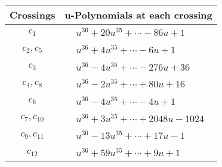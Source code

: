 \documentclass[1p]{elsarticle_modified}
\theoremstyle{definition}
\begin{document}
\begin{tabular}{m{50pt}|m{274pt}}
Crossings & \hspace{64pt}u-Polynomials at each crossing \\
\hline $$\begin{aligned}c_{1}\end{aligned}$$&$\begin{aligned}
&u^{36}+20 u^{35}+\cdots-86 u+1
\end{aligned}$\\
\hline $$\begin{aligned}c_{2},c_{5}\end{aligned}$$&$\begin{aligned}
&u^{36}+4 u^{35}+\cdots-6 u+1
\end{aligned}$\\
\hline $$\begin{aligned}c_{3}\end{aligned}$$&$\begin{aligned}
&u^{36}-4 u^{35}+\cdots-276 u+36
\end{aligned}$\\
\hline $$\begin{aligned}c_{4},c_{8}\end{aligned}$$&$\begin{aligned}
&u^{36}-2 u^{35}+\cdots+80 u+16
\end{aligned}$\\
\hline $$\begin{aligned}c_{6}\end{aligned}$$&$\begin{aligned}
&u^{36}-4 u^{35}+\cdots-4 u+1
\end{aligned}$\\
\hline $$\begin{aligned}c_{7},c_{10}\end{aligned}$$&$\begin{aligned}
&u^{36}+3 u^{35}+\cdots+2048 u-1024
\end{aligned}$\\
\hline $$\begin{aligned}c_{9},c_{11}\end{aligned}$$&$\begin{aligned}
&u^{36}-13 u^{35}+\cdots+17 u-1
\end{aligned}$\\
\hline $$\begin{aligned}c_{12}\end{aligned}$$&$\begin{aligned}
&u^{36}+59 u^{35}+\cdots+9 u+1
\end{aligned}$\\
\hline
\end{tabular}\\~\\
\end{document}
